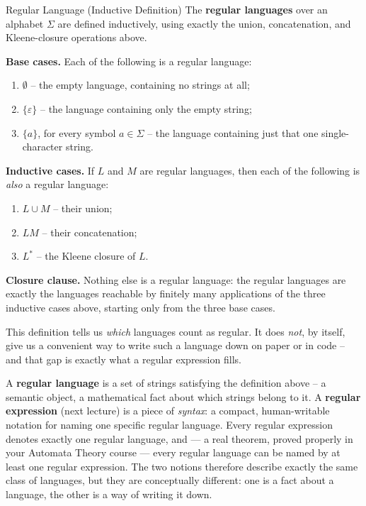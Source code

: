 \documentclass[full-course-notes.tex]{subfiles}
\begin{document}
\begin{defbox}{Regular Language (Inductive Definition)}
The \textbf{regular languages} over an alphabet $\Sigma$ are defined inductively, using exactly
the union, concatenation, and Kleene-closure operations above.

\textbf{Base cases.} Each of the following is a regular language:
\begin{enumerate}[label=(\alph*)]
  \item $\emptyset$ -- the empty language, containing no strings at all;
  \item $\{\varepsilon\}$ -- the language containing only the empty string;
  \item $\{a\}$, for every symbol $a \in \Sigma$ -- the language containing just that one
  single-character string.
\end{enumerate}

\textbf{Inductive cases.} If $L$ and $M$ are regular languages, then each of the following is
\emph{also} a regular language:
\begin{enumerate}[label=(\arabic*)]
  \item $L \cup M$ -- their union;
  \item $LM$ -- their concatenation;
  \item $L^{*}$ -- the Kleene closure of $L$.
\end{enumerate}

\textbf{Closure clause.} Nothing else is a regular language: the regular languages are exactly
the languages reachable by finitely many applications of the three inductive cases above,
starting only from the three base cases.
\end{defbox}

This definition tells us \emph{which} languages count as regular. It does \emph{not}, by
itself, give us a convenient way to write such a language down on paper or in code -- and that
gap is exactly what a regular expression fills.

\begin{coreidea}
A \textbf{regular language} is a set of strings satisfying the definition above -- a semantic
object, a mathematical fact about which strings belong to it. A \textbf{regular expression}
(next lecture) is a piece of \emph{syntax}: a compact, human-writable notation for naming one
specific regular language. Every regular expression denotes exactly one regular language, and
--- a real theorem, proved properly in your Automata Theory course --- every regular language
can be named by at least one regular expression. The two notions therefore describe exactly the
same class of languages, but they are conceptually different: one is a fact about a language,
the other is a way of writing it down.
\end{coreidea}
\end{document}
